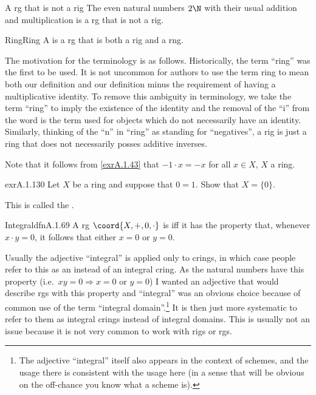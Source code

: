 \begin{exm}{A rg that is not a rig}{}
The even natural numbers $2\N$ with their usual addition and multiplication is a rg that is not a rig.
\end{exm}
\begin{dfn}{Ring}{Ring}
A  is a rg that is both a rig and a rng.
\begin{rmk}
The motivation for the terminology is as follows.  Historically, the term ``ring'' was the first to be used.  It is not uncommon for authors to use the term ring to mean both our definition and our definition minus the requirement of having a multiplicative identity.  To remove this ambiguity in terminology, we take the term ``ring'' to imply the existence of the identity and the removal of the ``i'' from the word is the term used for objects which do not necessarily have an identity.  Similarly, thinking of the ``n'' in ``ring'' as standing for ``negatives'', a rig is just a ring that does not necessarily posses additive inverses.
\end{rmk}
\begin{rmk}
Note that it follows from \cref{exrA.1.43} that $-1\cdot x=-x$ for all $x\in X$, $X$ a ring.
\end{rmk}
\end{dfn}
\begin{exr}{}{exrA.1.130}
Let $X$ be a ring and suppose that $0=1$.  Show that $X=\{ 0\}$.
\begin{rmk}
This is called the .
\end{rmk}
\end{exr}
\begin{dfn}{Integral}{dfnA.1.69}
A rg $\coord{X,+,0,\cdot}$ is  iff it has the property that, whenever $x\cdot y=0$, it follows that either $x=0$ or $y=0$.
\begin{rmk}
Usually the adjective ``integral'' is applied only to crings, in which case people refer to this as an  instead of an integral cring.  As the natural numbers have this property (i.e.~$xy=0\Rightarrow x=0\text{ or }y=0$) I wanted an adjective that would describe rgs with this property and ``integral'' was an obvious choice because of common use of the term ``integral domain''.\footnote{The adjective ``integral'' itself also appears in the context of schemes, and the usage there is consistent with the usage here (in a sense that will be obvious on the off-chance you know what a scheme is).}  It is then just more systematic to refer to them as integral crings instead of integral domains.  This is usually not an issue because it is not very common to work with rigs or rgs.
\end{rmk}
\end{dfn}
